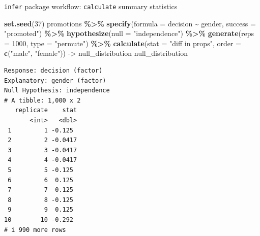 \documentclass[
  ignorenonframetext,
]{beamer}
\newenvironment{Shaded}{\begin{snugshade}}{\end{snugshade}}
\newcommand{\AttributeTok}[1]{\textcolor[rgb]{0.13,0.29,0.53}{#1}}
\newcommand{\DecValTok}[1]{\textcolor[rgb]{0.00,0.00,0.81}{#1}}
\newcommand{\FunctionTok}[1]{\textcolor[rgb]{0.13,0.29,0.53}{\textbf{#1}}}
\newcommand{\NormalTok}[1]{#1}
\newcommand{\OtherTok}[1]{\textcolor[rgb]{0.56,0.35,0.01}{#1}}
\newcommand{\SpecialCharTok}[1]{\textcolor[rgb]{0.81,0.36,0.00}{\textbf{#1}}}
\newcommand{\StringTok}[1]{\textcolor[rgb]{0.31,0.60,0.02}{#1}}
\begin{document}
\begin{frame}[fragile]{\texttt{infer} package workflow:
\texttt{calculate} summary statistics}
\protect\hypertarget{infer-package-workflow-calculate-summary-statistics-1}{}
\tiny

\begin{Shaded}
\begin{Highlighting}[]
\FunctionTok{set.seed}\NormalTok{(}\DecValTok{37}\NormalTok{)}
\NormalTok{promotions }\SpecialCharTok{\%\textgreater{}\%} 
  \FunctionTok{specify}\NormalTok{(}\AttributeTok{formula =}\NormalTok{ decision }\SpecialCharTok{\textasciitilde{}}\NormalTok{ gender, }\AttributeTok{success =} \StringTok{"promoted"}\NormalTok{) }\SpecialCharTok{\%\textgreater{}\%} 
  \FunctionTok{hypothesize}\NormalTok{(}\AttributeTok{null =} \StringTok{"independence"}\NormalTok{) }\SpecialCharTok{\%\textgreater{}\%} 
  \FunctionTok{generate}\NormalTok{(}\AttributeTok{reps =} \DecValTok{1000}\NormalTok{, }\AttributeTok{type =} \StringTok{"permute"}\NormalTok{) }\SpecialCharTok{\%\textgreater{}\%} 
  \FunctionTok{calculate}\NormalTok{(}\AttributeTok{stat =} \StringTok{"diff in props"}\NormalTok{, }\AttributeTok{order =} \FunctionTok{c}\NormalTok{(}\StringTok{"male"}\NormalTok{, }\StringTok{"female"}\NormalTok{)) }\OtherTok{{-}\textgreater{}}\NormalTok{ null\_distribution}
\NormalTok{null\_distribution}
\end{Highlighting}
\end{Shaded}

\begin{verbatim}
Response: decision (factor)
Explanatory: gender (factor)
Null Hypothesis: independence
# A tibble: 1,000 x 2
   replicate    stat
       <int>   <dbl>
 1         1 -0.125 
 2         2 -0.0417
 3         3 -0.0417
 4         4 -0.0417
 5         5 -0.125 
 6         6  0.125 
 7         7  0.125 
 8         8 -0.125 
 9         9  0.125 
10        10 -0.292 
# i 990 more rows
\end{verbatim}

\normalsize
\end{frame}
\end{document}
